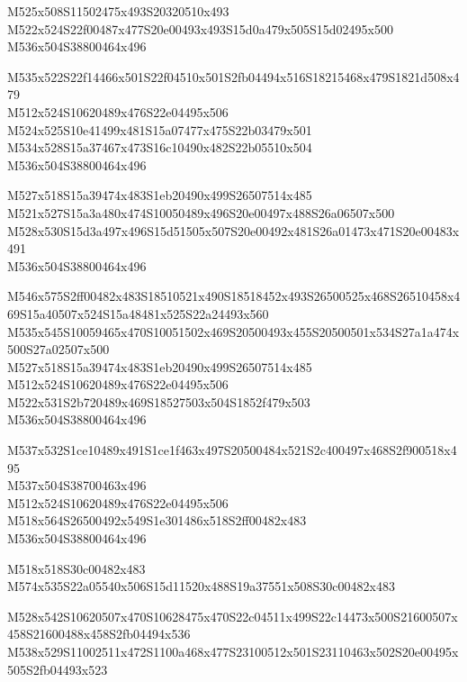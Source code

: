 \documentclass{article}
\begin{document}
\begin{multicols}{5}
\begin{center}
M525x508S11502475x493S20320510x493 %
\\M522x524S22f00487x477S20e00493x493S15d0a479x505S15d02495x500 %
\\M536x504S38800464x496 %

M535x522S22f14466x501S22f04510x501S2fb04494x516S18215468x479S1821d508x479 %
\\M512x524S10620489x476S22e04495x506 %
\\M524x525S10e41499x481S15a07477x475S22b03479x501 %
\\M534x528S15a37467x473S16c10490x482S22b05510x504 %
\\M536x504S38800464x496 %

M527x518S15a39474x483S1eb20490x499S26507514x485 %
\\M521x527S15a3a480x474S10050489x496S20e00497x488S26a06507x500 %
\\M528x530S15d3a497x496S15d51505x507S20e00492x481S26a01473x471S20e00483x491 %
\\M536x504S38800464x496 %

M546x575S2ff00482x483S18510521x490S18518452x493S26500525x468S26510458x469S15a40507x524S15a48481x525S22a24493x560 %
\\M535x545S10059465x470S10051502x469S20500493x455S20500501x534S27a1a474x500S27a02507x500 %
\\M527x518S15a39474x483S1eb20490x499S26507514x485 %
\\M512x524S10620489x476S22e04495x506 %
\\M522x531S2b720489x469S18527503x504S1852f479x503 %
\\M536x504S38800464x496 %

M537x532S1ce10489x491S1ce1f463x497S20500484x521S2c400497x468S2f900518x495 %
\\M537x504S38700463x496 %
\\M512x524S10620489x476S22e04495x506 %
\\M518x564S26500492x549S1e301486x518S2ff00482x483 %
\\M536x504S38800464x496 %

M518x518S30c00482x483 %
\\M574x535S22a05540x506S15d11520x488S19a37551x508S30c00482x483 %

M528x542S10620507x470S10628475x470S22c04511x499S22c14473x500S21600507x458S21600488x458S2fb04494x536 %
\\M538x529S11002511x472S1100a468x477S23100512x501S23110463x502S20e00495x505S2fb04493x523 %

\end{center}
\end{multicols}
\end{document}

